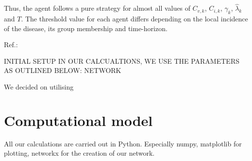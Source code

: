 \documentclass[11pt]{article}
\begin{document}
Thus, the agent follows a pure strategy for almost all values of $C_{v,k}$, $C_{i,k}$, $\gamma_{k}$, $\hat{\lambda}_{k}$ and $T$. The threshold value for each agent differs depending on the local incidence of the disease, its group membership and time-horizon.

Ref.:
\cite{shim2012}

INITIAL SETUP
IN OUR CALCUALTIONS, WE USE THE PARAMETERS AS OUTLINED BELOW:
NETWORK

We decided on utilising 

\section{Computational model}

All our calculations are carried out in Python. Especially numpy, matplotlib for plotting, networkx for the creation of our network. 
\end{document}
